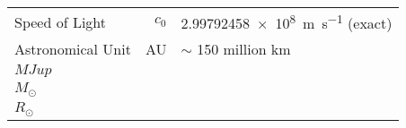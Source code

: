 \begin{constants}
    \begin{longtable}{lr@{${}={}$}l}

     Speed of Light & \(c_{0}\) & \SI{2.99792458e8}{\meter\per\second} (exact)\\
     Astronomical Unit & AU & \(\sim\) 150 million km\\
     
     \(MJup\) & &\\
     \(M_\odot\) & &\\
     \(R_\odot\) & &\\
\end{longtable}
\end{constants}
